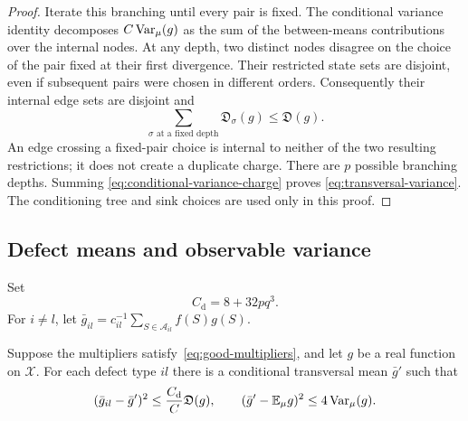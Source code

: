 \begin{proof}
Iterate this branching until every pair is fixed. The conditional
variance identity decomposes $C\operatorname{Var}_\mu(g)$ as the sum of the
between-means contributions over the internal nodes.
At any depth, two distinct nodes disagree on the choice of the pair
fixed at their first divergence. Their restricted state sets are
disjoint, even if subsequent pairs were chosen in different orders.
Consequently their internal edge sets are disjoint and
\[
  \sum_{\sigma\text{ at a fixed depth}}\mathfrak D_\sigma(g)
  \leq\mathfrak D(g).
\]
An edge crossing a fixed-pair choice is internal to neither of the
two resulting restrictions; it does not create a duplicate charge.
There are $p$ possible branching depths. Summing
\eqref{eq:conditional-variance-charge} proves
\eqref{eq:transversal-variance}.
The conditioning tree and sink choices are used only in this proof.
\end{proof}

\subsection{Defect means and observable variance}

Set
\[
  C_{\mathrm d}=8+32pq^3.
\]
For $i\ne l$, let
$\bar g_{il}=c_{il}^{-1}\sum_{S\in\mathcal A_{il}}f(S)g(S)$.

\begin{lemma}
\label{lem:defect-mean}
Suppose the multipliers satisfy~\eqref{eq:good-multipliers}, and let
$g$ be a real function on $\mathcal X$.
For each defect type $il$ there is a conditional transversal mean
$\bar g'$ such that
\begin{equation}
 (\bar g_{il}-\bar g')^2
       \leq \frac{C_{\mathrm d}}{C}\mathfrak D(g),
 \qquad
 (\bar g'-\mathbb E_\mu g)^2\leq4\operatorname{Var}_\mu(g).
 \label{eq:defect-mean-bounds}
\end{equation}
\end{lemma}


